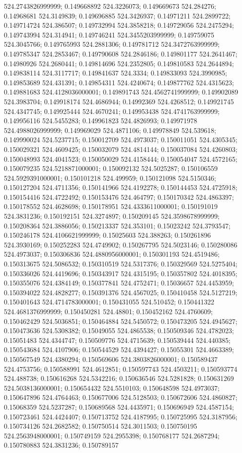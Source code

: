 524.2743826999999; 0.149668892 524.3226073; 0.149669673 524.284276; 0.14968681 524.3149839; 0.149696885 524.3426937; 0.14971211 524.2899722; 0.149714724 524.386507; 0.149732994 524.3858218; 0.149729056 524.2475294; 0.149743994 524.314941; 0.149746241 524.3455203999999; 0.149759075 524.3045766; 0.149765993 524.2881306; 0.149781712 524.3472763999999; 0.149785347 524.2853467; 0.149790608 524.2846186; 0.149801177 524.2641467; 0.14980926 524.2680441; 0.149814696 524.2352805; 0.149810583 524.2644894; 0.149838114 524.3117717; 0.149841637 524.3334; 0.149833093 524.3990985; 0.149853689 524.431391; 0.149854311 524.4240674; 0.149877762 524.4315623; 0.149881683 524.4128036000001; 0.149891743 524.4562741999999; 0.149902089 524.3983704; 0.149918174 524.4686944; 0.14992369 524.4268512; 0.149921745 524.4347745; 0.149925444 524.4670241; 0.149953438 524.4741763999999; 0.149956116 524.5455283; 0.149961823 524.4826993; 0.149971978 524.4988026999999; 0.149969029 524.4871106; 0.149978849 524.539618; 0.149990024 524.5237715; 0.150012709 524.4973037; 0.150011051 524.4305345; 0.150029321 524.4609425; 0.150032079 524.4814144; 0.150037084 524.4260803; 0.150048993 524.4041523; 0.150050029 524.4158444; 0.150054047 524.4572165; 0.150079235 524.5218871000001; 0.150092132 524.5025287; 0.150106559 524.5929391000001; 0.150101218 524.499959; 0.150121098 524.5150346; 0.150127204 524.4711356; 0.150141966 524.4192278; 0.150144453 524.4725918; 0.150154416 524.4722492; 0.150153476 524.464797; 0.150170342 524.4863397; 0.150178552 524.4628698; 0.150178951 524.4333611000001; 0.150191019 524.3831236; 0.150192151 524.3274897; 0.150209145 524.3598678999999; 0.150208364 524.3886056; 0.150213337 524.353101; 0.15023242 524.3793547; 0.150246178 524.4106621999999; 0.15025603 524.388263; 0.150261896 524.3930169; 0.150252283 524.4749902; 0.150267795 524.5023146; 0.150280086 524.4973037; 0.150306836 524.4880956000001; 0.150301193 524.4519486; 0.150313675 524.5086532; 0.150310519 524.5317376; 0.150329569 524.5275404; 0.150336026 524.4419696; 0.150343917 524.4315195; 0.150357802 524.4018395; 0.150355076 524.4384149; 0.150377841 524.4752471; 0.15036657 524.4453959; 0.150394022 524.4828277; 0.150391376 524.4567025; 0.150410458 524.5127219; 0.150401643 524.4714783000001; 0.150431055 524.510452; 0.150441322 524.4681376999999; 0.150450281 524.48801; 0.150452162 524.4760609; 0.150462429 524.5036851; 0.150464884 524.5450572; 0.150473205 524.4945627; 0.150473636 524.5308382; 0.15049055 524.4865538; 0.150509346 524.4782023; 0.15051483 524.4344747; 0.150509776 524.4715639; 0.150539444 524.440385; 0.150543684 524.4107906; 0.150544529 524.4394427; 0.15055301 524.4663389; 0.150567549 524.4380294; 0.150569606 524.3803826000001; 0.150589437 524.4753756; 0.150588991 524.4612851; 0.150597743 524.4503211; 0.150593774 524.488738; 0.150616268 524.5342216; 0.150636546 524.5281828; 0.150631269 524.5038136000001; 0.150654432 524.5510103; 0.150648598 524.4973037; 0.150647896 524.4764463; 0.150677006 524.5128503; 0.150672606 524.4860827; 0.15068359 524.5237287; 0.150689568 524.4435971; 0.150696949 524.4587154; 0.150723461 524.4424407; 0.150713752 524.4187995; 0.150725995 524.3187956; 0.150734126 524.2682582; 0.150750514 524.3011503; 0.150750195 524.2563948000001; 0.150749159 524.2955398; 0.150768177 524.2687294; 0.150780883 524.3831236; 0.150789157 